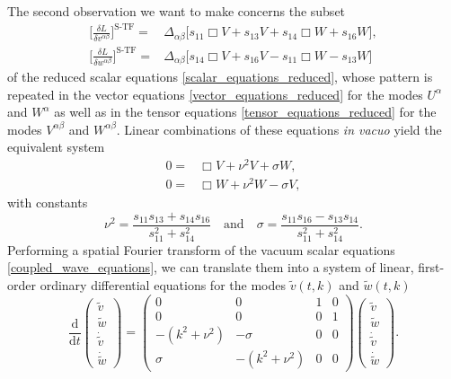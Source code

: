 The second observation we want to make concerns the subset
\begin{equation}
  \begin{aligned}
  \bigg\lbrack\frac{\delta L}{\delta v^{\alpha\beta}}\bigg\rbrack^\text{S-TF} = {} & \Delta_{\alpha\beta} \bigg\lbrack s_{11} \Box V + s_{13} V + s_{14} \Box W + s_{16} W \bigg\rbrack, \\
  \bigg\lbrack\frac{\delta L}{\delta w^{\alpha\beta}}\bigg\rbrack^\text{S-TF} = {} & \Delta_{\alpha\beta} \bigg\lbrack s_{14} \Box V + s_{16} V - s_{11} \Box W - s_{13} W \bigg\rbrack
  \end{aligned}
\end{equation}
of the reduced scalar equations \eqref{scalar_equations_reduced}, whose pattern is repeated in the vector equations \eqref{vector_equations_reduced} for the modes $U^\alpha$ and $W^\alpha$ as well as in the tensor equations \eqref{tensor_equations_reduced} for the modes $V^{\alpha\beta}$ and $W^{\alpha\beta}$. Linear combinations of these equations \emph{in vacuo} yield the equivalent system
\begin{equation}\label{coupled_wave_equations}
  \begin{aligned}
    0 = {} & \Box V + \nu^2 V + \sigma W, \\
    0 = {} & \Box W + \nu^2 W - \sigma V,
  \end{aligned}
\end{equation}
with constants
\begin{equation}
  \nu^2 = \frac{s_{11}s_{13}+s_{14}s_{16}}{s_{11}^2+s_{14}^2}\quad\text{and}\quad\sigma = \frac{s_{11}s_{16} - s_{13} s_{14}}{s_{11}^2 + s_{14}^2}.
\end{equation}
Performing a spatial Fourier transform of the vacuum scalar equations \ref{coupled_wave_equations}, we can translate them into a system of linear, first-order ordinary differential equations for the modes $\tilde v(t,k)$ and $\tilde w(t,k)$
\begin{equation}
  \frac{\mathrm d}{\mathrm dt}\begin{pmatrix}\tilde v \\ \tilde w \\ \dot{\tilde v} \\ \dot{\tilde w}\end{pmatrix} = \begin{pmatrix}0 & 0 & 1 & 0 \\ 0 & 0 & 0 & 1 \\ -(k^2 + \nu^2) & -\sigma & 0 & 0 \\ \sigma & -(k^2 + \nu^2) & 0 & 0\end{pmatrix}\begin{pmatrix}\tilde v \\ \tilde w \\ \dot{\tilde v} \\ \dot{\tilde w}\end{pmatrix}.
\end{equation}
